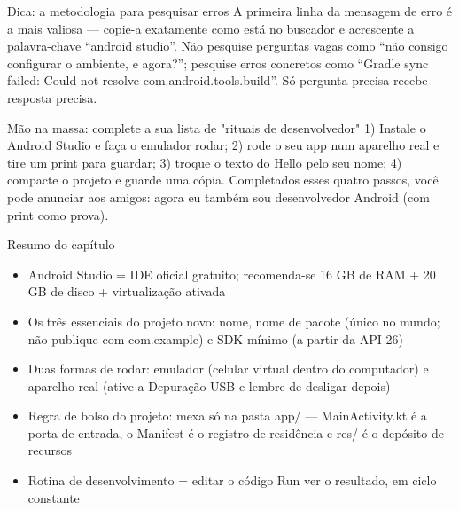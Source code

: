 \begin{tcbinfo}{Dica: a metodologia para pesquisar erros}
A primeira linha da mensagem de erro é a mais valiosa — copie-a exatamente como está no buscador e acrescente a palavra-chave “android studio”. Não pesquise perguntas vagas como “não consigo configurar o ambiente, e agora?”; pesquise erros concretos como “Gradle sync failed: Could not resolve com.android.tools.build”. Só pergunta precisa recebe resposta precisa.

\end{tcbinfo}

\begin{tcbpractice}{Mão na massa: complete a sua lista de "rituais de desenvolvedor"}
1) Instale o Android Studio e faça o emulador rodar; 2) rode o seu app num aparelho real e tire um print para guardar; 3) troque o texto do Hello pelo seu nome; 4) compacte o projeto e guarde uma cópia. Completados esses quatro passos, você pode anunciar aos amigos: agora eu também sou desenvolvedor Android (com print como prova).

\end{tcbpractice}

\begin{tcbsummary}{Resumo do capítulo}
\begin{itemize}
  \item Android Studio = IDE oficial gratuito; recomenda-se 16 GB de RAM + 20 GB de disco + virtualização ativada
  \item Os três essenciais do projeto novo: nome, nome de pacote (único no mundo; não publique com com.example) e SDK mínimo (a partir da API 26)
  \item Duas formas de rodar: emulador (celular virtual dentro do computador) e aparelho real (ative a Depuração USB e lembre de desligar depois)
  \item Regra de bolso do projeto: mexa só na pasta app/ — MainActivity.kt é a porta de entrada, o Manifest é o registro de residência e res/ é o depósito de recursos
  \item Rotina de desenvolvimento = editar o código Run ver o resultado, em ciclo constante
\end{itemize}

\end{tcbsummary}
